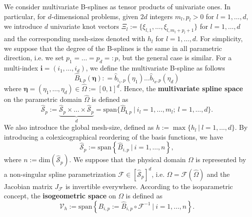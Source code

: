 \documentclass{article}
\newcommand{\ndof}{m}
\newcommand{\vect}[1]{\boldsymbol{#1}}
\theoremstyle{plain}
\numberwithin{equation}{section}
\begin{document}
We consider multivariate B-splines as tensor products of
univariate ones. In particular, for $d$-dimensional problems, given $2d$ integers $\ndof_l,p_l>0$ for $l=1,\ldots,d,$ we introduce $d$ univariate knot vectors $\Xi_l:=\{\xi_{l,1},\ldots,\xi_{l,\ndof_{l}+p_l+1}\}$   for
$l=1 , \ldots, d$ and the corresponding mesh-sizes denoted with $h_l$  for
$l=1 ,\ldots, d$.   For simplicity, we suppose that the degree of the B-splines is the same in all parametric direction, i.e. we set  $p_1=\ldots=p_d=:p$, but the general case is similar.   For a multi-index $\vect{i} = (i_1, \ldots, i_d)$, we define the multivariate B-spline as follows
\begin{equation*}
    \widehat{B}_{\vect{i},  {p}}(\vect{\eta}) : = \widehat{b}_{i_1, p }(\eta_1) \ldots \widehat{b}_{i_d, p }(\eta_d)
\end{equation*}
where $\vect{\eta} = (\eta_1, \ldots, \eta_d)\in \widehat{\Omega}:=\left[0,1\right]^d$. Hence, the \textbf{multivariate spline space} on the parametric domain $\widehat{\Omega}$ is defined as
\begin{equation*}
    \widehat{\mathcal{S}}_{p}:= \underbrace{ \widehat{\mathcal{S}}_{p} \times \ldots \times \widehat{\mathcal{S}}_{p}}_{d}=\mathrm{span}\{\widehat{B}_{\vect{i}, {p}} \ | \ i_l = 1,\ldots, \ndof_{l}; \  l=1,\ldots, d \}.
\end{equation*}
We also introduce the global mesh-size, defined as $h:=\max\{h_l\ | \ l=1,\ldots, d\}$. By introducing a colexicographical reordering of the basis functions, we have
\begin{equation*}
    \widehat{\mathcal{S}}_{p}:=\mathrm{span}\left\{ \widehat{B}_{ {i},p} \ | \ i = 1,\dots,n \right\},
\end{equation*}
where $n:=\mathrm{dim}(\widehat{\mathcal{S}}_{p})$.
We suppose that the physical domain $\Omega$ is represented by a non-singular spline parametrization $\mathcal{F}\in \left[ \widehat{\mathcal{S}}_{p}\right]^d$, i.e. $\Omega = \mathcal{F}(\widehat{\Omega})$ and the Jacobian matrix $J_{\mathcal{F}}$ is invertible everywhere.
According to the isoparametric concept, the \textbf{isogeometric space} on $\Omega$ is defined as
\begin{equation}
    \mathcal{V}_{h}:= \mathrm{span}\left\{{B}_{ {i}, p}:=\widehat{B}_{ {i}, p} \circ \mathcal{F}^{-1} \  \big| \ i = 1,\dotsc, n  \right\}.
    \label{eq:isogeometric_space}
\end{equation}

\end{document}
